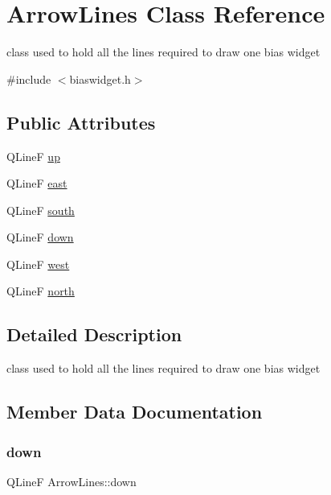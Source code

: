 \hypertarget{class_arrow_lines}{}\section{Arrow\+Lines Class Reference}
\label{class_arrow_lines}


class used to hold all the lines required to draw one bias widget  




{\ttfamily \#include $<$biaswidget.\+h$>$}

\subsection*{Public Attributes}
\begin{DoxyCompactItemize}
\item 
Q\+LineF \mbox{\hyperlink{class_arrow_lines_a8121b26b2128ac789912716a0203aeb0}{up}}
\item 
Q\+LineF \mbox{\hyperlink{class_arrow_lines_abfea95a3e200b0949b7fe7ec2f7a3efc}{east}}
\item 
Q\+LineF \mbox{\hyperlink{class_arrow_lines_aa413ebfe24528231f7de44ff2a069727}{south}}
\item 
Q\+LineF \mbox{\hyperlink{class_arrow_lines_a94469fb96d16eca1bac70fb118a5440e}{down}}
\item 
Q\+LineF \mbox{\hyperlink{class_arrow_lines_ac5c89638cd64fc618c5245131fd15c86}{west}}
\item 
Q\+LineF \mbox{\hyperlink{class_arrow_lines_aabe733284f551ad276d819a84dddcfaa}{north}}
\end{DoxyCompactItemize}


\subsection{Detailed Description}
class used to hold all the lines required to draw one bias widget 

\subsection{Member Data Documentation}
\mbox{\label{class_arrow_lines_a94469fb96d16eca1bac70fb118a5440e}} 
\subsubsection{\texorpdfstring{down}{down}}
{\footnotesize\ttfamily Q\+LineF Arrow\+Lines\+::down}

